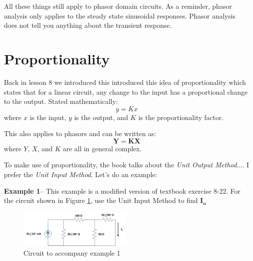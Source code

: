 \documentclass{handout}
\begin{document}
All these things still apply to phasor domain circuits. As a reminder, phasor analysis only applies to the steady state sinusoidal responses.  Phasor analysis does not tell you anything about the transient response.


\section{Proportionality}
Back in lesson 8 we introduced this introduced this idea of proportionality which states that for a linear circuit, any change to the input has a proportional change to the output.  Stated mathematically:
\[
y=Kx
\]
where $x$ is the input, $y$ is the output, and $K$ is the proportionality factor.

This also applies to phasors and can be written as:
\[
\mathbf{Y} = \mathbf{KX}
\]
where $Y$, $X$, and $K$ are all in general complex.

To make use of proportionality, the book talks about the {\em Unit Output Method}.... I prefer the {\em Unit Input Method}.  Let's do an example:

\textbf{Example 1}-- This example is a modified version of textbook exercise 8-22.  For the circuit shown in Figure \ref{fig: Example1}, use the Unit Input Method to find $\mathbf{I_o}$

\begin{figure} [h!]
\centering
\includegraphics[width=0.5\textwidth]{Example1.jpg}
\caption{Circuit to accompany example 1}
\label{fig: Example1}
\end{figure}


\end{document}
